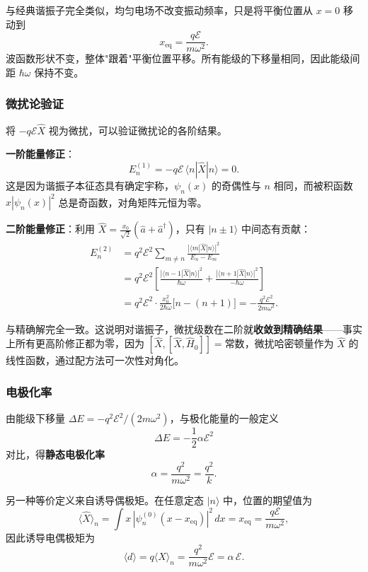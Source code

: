 \begin{insightbox}
与经典谐振子完全类似，均匀电场不改变振动频率，只是将平衡位置从 $x=0$ 移动到
\[
x_\text{eq} = \frac{q\mathcal{E}}{m\omega^2}.
\]
波函数形状不变，整体"跟着"平衡位置平移。所有能级的下移量相同，因此能级间距 $\hbar\omega$ 保持不变。
\end{insightbox}

\subsubsection{微扰论验证}

将 $-q\mathcal{E}\hat{X}$ 视为微扰，可以验证微扰论的各阶结果。

\textbf{一阶能量修正}：
\[
E_n^{(1)} = -q\mathcal{E}\,\langle n|\hat{X}|n\rangle = 0.
\]
这是因为谐振子本征态具有确定宇称，$\psi_n(x)$ 的奇偶性与 $n$ 相同，而被积函数 $x|\psi_n(x)|^2$ 总是奇函数，对角矩阵元恒为零。

\textbf{二阶能量修正}：利用 $\hat{X} = \frac{x_0}{\sqrt{2}}(\hat{a} + \hat{a}^\dagger)$，只有 $|n\pm 1\rangle$ 中间态有贡献：
\begin{align*}
E_n^{(2)}
&= q^2\mathcal{E}^2\sum_{m\neq n}\frac{|\langle m|\hat{X}|n\rangle|^2}{E_n - E_m} \\
&= q^2\mathcal{E}^2\left[
\frac{|\langle n-1|\hat{X}|n\rangle|^2}{\hbar\omega}
+ \frac{|\langle n+1|\hat{X}|n\rangle|^2}{-\hbar\omega}
\right] \\
&= q^2\mathcal{E}^2\cdot\frac{x_0^2}{2\hbar\omega}\bigl[n - (n+1)\bigr]
= -\frac{q^2\mathcal{E}^2}{2m\omega^2}.
\end{align*}

与精确解完全一致。这说明对谐振子，微扰级数在二阶就\textbf{收敛到精确结果}——事实上所有更高阶修正都为零，因为 $[\hat{X}, [\hat{X}, \hat{H}_0]] = \text{常数}$，微扰哈密顿量作为 $\hat{X}$ 的线性函数，通过配方法可一次性对角化。

\subsubsection{电极化率}

由能级下移量 $\Delta E = -q^2\mathcal{E}^2/(2m\omega^2)$，与极化能量的一般定义
\[
\Delta E = -\frac12 \alpha \mathcal{E}^2
\]
对比，得\textbf{静态电极化率}
\begin{equation}
\boxed{\alpha = \frac{q^2}{m\omega^2} = \frac{q^2}{k}.}
\end{equation}

另一种等价定义来自诱导偶极矩。在任意定态 $|n\rangle$ 中，位置的期望值为
\[
\langle\hat{X}\rangle_n = \int x\,|\psi_n^{(0)}(x - x_\text{eq})|^2\,dx = x_\text{eq} = \frac{q\mathcal{E}}{m\omega^2},
\]
因此诱导电偶极矩为
\[
\langle d\rangle = q\langle\hat{X}\rangle_n = \frac{q^2}{m\omega^2}\mathcal{E} = \alpha\,\mathcal{E}.
\]

